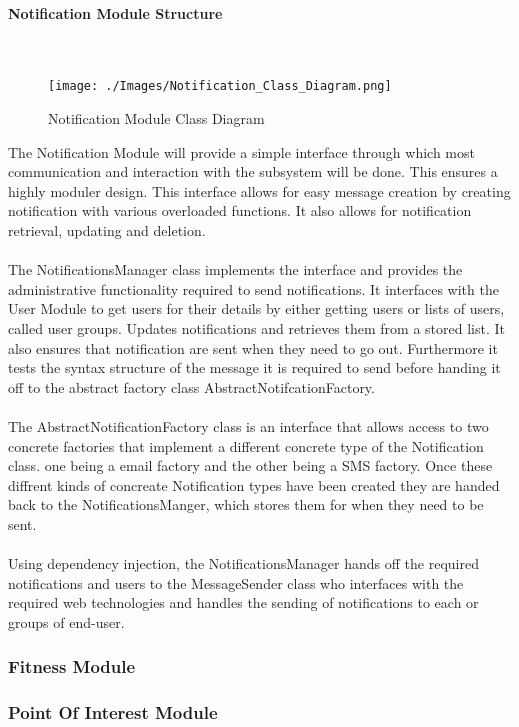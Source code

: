 \documentclass{article}
\begin{document}
			\newpage
			\paragraph	{Notification Module Structure} \mbox{} \\
			\begin{figure}[h]
				\texttt{[image: ./Images/Notification\_Class\_Diagram.png]} 
				\caption{Notification Module Class Diagram}
			\end{figure}
			
			{The Notification Module will provide a simple interface through which most communication and interaction with the subsystem will be done. This ensures a highly moduler design. This interface allows for easy message creation by creating notification with various overloaded functions. It also allows for notification retrieval, updating and deletion.\\ \\The NotificationsManager class implements the interface and provides the administrative functionality required to send notifications. It interfaces with the User Module to get users for their details by either getting users or lists of users, called user groups. Updates notifications and retrieves them from a stored list. It also ensures that notification are sent when they need to go out. Furthermore it tests the syntax structure of the message it is required to send before handing it off to the abstract factory class AbstractNotifcationFactory.\\ \\The AbstractNotificationFactory class is an interface that allows access to two concrete factories that implement a different concrete type of the Notification class. one being a email factory and the other being a SMS factory. Once these diffrent kinds of concreate Notification types have been created they are handed back to the NotificationsManger, which stores them for when they need to be sent.\\\\Using dependency injection, the NotificationsManager hands off the required notifications and users to the MessageSender class who interfaces with the required web technologies and handles the sending of notifications to each  or groups of end-user.}
		\subsubsection{Fitness Module}
		\subsubsection{Point Of Interest Module}
\end{document}
